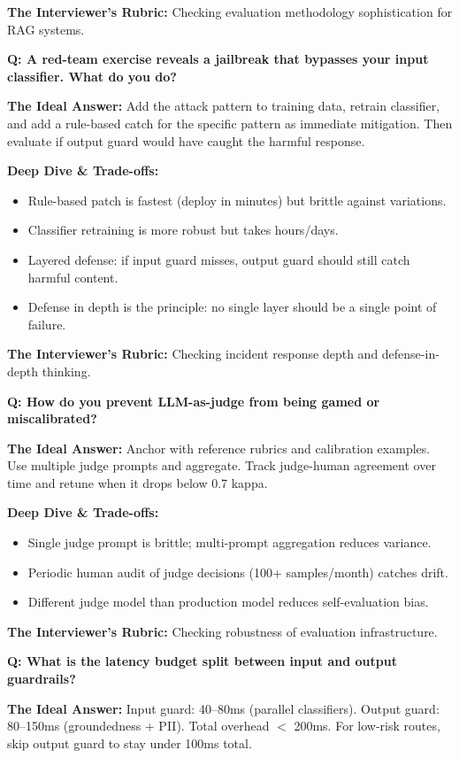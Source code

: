 \textbf{The Interviewer's Rubric:} Checking evaluation methodology sophistication for RAG systems.

\textbf{Q: A red-team exercise reveals a jailbreak that bypasses your input classifier. What do you do?}

\textbf{The Ideal Answer:} Add the attack pattern to training data, retrain classifier, and add a rule-based catch for the specific pattern as immediate mitigation. Then evaluate if output guard would have caught the harmful response.

\textbf{Deep Dive \& Trade-offs:}
\begin{itemize}
  \item Rule-based patch is fastest (deploy in minutes) but brittle against variations.
  \item Classifier retraining is more robust but takes hours/days.
  \item Layered defense: if input guard misses, output guard should still catch harmful content.
  \item Defense in depth is the principle: no single layer should be a single point of failure.
\end{itemize}

\textbf{The Interviewer's Rubric:} Checking incident response depth and defense-in-depth thinking.

\textbf{Q: How do you prevent LLM-as-judge from being gamed or miscalibrated?}

\textbf{The Ideal Answer:} Anchor with reference rubrics and calibration examples. Use multiple judge prompts and aggregate. Track judge-human agreement over time and retune when it drops below 0.7 kappa.

\textbf{Deep Dive \& Trade-offs:}
\begin{itemize}
  \item Single judge prompt is brittle; multi-prompt aggregation reduces variance.
  \item Periodic human audit of judge decisions (100+ samples/month) catches drift.
  \item Different judge model than production model reduces self-evaluation bias.
\end{itemize}

\textbf{The Interviewer's Rubric:} Checking robustness of evaluation infrastructure.

\textbf{Q: What is the latency budget split between input and output guardrails?}

\textbf{The Ideal Answer:} Input guard: 40--80ms (parallel classifiers). Output guard: 80--150ms (groundedness + PII). Total overhead $<$ 200ms. For low-risk routes, skip output guard to stay under 100ms total.

